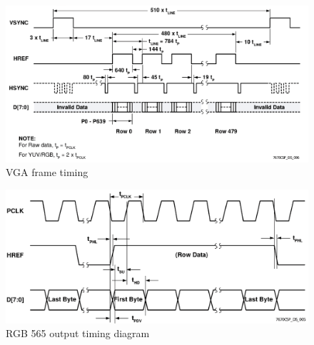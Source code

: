 \documentclass[a4paper]{article}
\begin{document}
\begin{figure}[H]
    \centering
    \includegraphics[scale=0.4]{images/Signal.png}
    \caption{VGA frame timing}
    \label{fig:my_label}
\end{figure}
\begin{figure}[H]
    \centering
    \includegraphics[scale=0.3]{images/timmimg.png}
    \caption{RGB 565 output timing diagram}
    \label{fig:my_label}
\end{figure}
\end{document}
